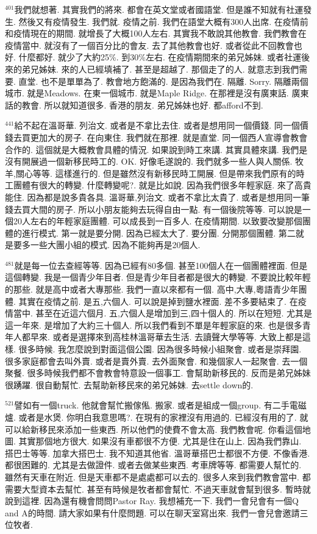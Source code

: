 \documentclass{book}
\begin{document}
$^{401}$我們就想著.
其實我們的將來.
都會在英文堂或者國語堂.
但是誰不知就有社運發生.
然後又有疫情發生.
我們就.
疫情之前.
我們在語堂大概有300人出席.
在疫情前和疫情現在的期間.
就增長了大概100人左右.
其實我不敢說其他教會.
我們教會在疫情當中.
就沒有了一個百分比的會友.
去了其他教會也好.
或者從此不回教會也好.
什麼都好.
就少了大約25\%.
到30\%左右.
在疫情期間來的弟兄姊妹.
或者社運後來的弟兄姊妹.
來的人已經填補了.
甚至是超越了.
那個走了的人.
就意志到我們需要.
直堂.
也不是單單為了.
教會地方飽滿的.
是因為我們在.
隔離.
Sorry.
隔離兩個城市.
就是Meadows.
在東一個城市.
就是Maple Ridge.
在那裡是沒有廣東話.
廣東話的教會.
所以就知道很多.
香港的朋友.
弟兄姊妹也好.
都afford不到.

$^{441}$給不起在溫哥華.
列治文.
或者是不拿比去住.
或者是想用同一個價錢.
同一個價錢去買更加大的房子.
在向東住.
我們就在那裡.
就是直堂.
同一個西人宣導會教會合作的.
這個就是大概教會具體的情況.
如果說到時工來講.
其實具體來講.
我們是沒有開展過一個新移民時工的.
OK.
好像毛遂說的.
我們就多一些人與人關係.
牧羊,關心等等.
這樣進行的.
但是雖然沒有新移民時工開展.
但是帶來我們原有的時工團體有很大的轉變.
什麼轉變呢?.
就是比如說.
因為我們很多年輕家庭.
來了高貴能住.
因為都是說多貴各具.
溫哥華,列治文.
或者不拿比太貴了.
或者是想用同一筆錢去買大間的房子.
所以小朋友能夠去玩得自由一點.
有一個後院等等.
可以說是一個20人左右的年輕家庭團體.
可以成長到一百多人.
在疫情期間.
以致要改變那個團體的進行模式.
第一就是要分開.
因為已經太大了.
要分團.
分開那個團體.
第二就是要多一些大團小組的模式.
因為不能夠再是20個人.

$^{481}$就是每一位去查經等等.
因為已經有80多個.
甚至100個人在一個團體裡面.
但是這個轉變.
我是一個青少年目者.
但是青少年目者都是很大的轉變.
不要說比較年輕的那些.
就是高中或者大專那些.
我們一直以來都有一個.
高中,大專,粵語青少年團體.
其實在疫情之前.
是五,六個人.
可以說是掉到鹽水裡面.
差不多要結束了.
在疫情當中.
甚至在近這六個月.
五,六個人是增加到三,四十個人的.
所以在短短.
尤其是這一年來.
是增加了大約三十個人.
所以我們看到不單是年輕家庭的來.
也是很多青年人都早來.
或者是選擇來到高桂林溫哥華去生活.
去讀聲大學等等.
大致上都是這樣.
很多時候.
我怎麼說到對面這個公園.
因為很多時候小組聚會.
或者是崇拜園.
很多家庭都會去叫外賣.
或者是賣外賣.
去外面聚會.
和幾個家人一起聚會.
去一個聚餐.
很多時候我們都不會教會特意設一個事工.
會幫助新移民的.
反而是弟兄姊妹很踴躍.
很自動幫忙.
去幫助新移民來的弟兄姊妹.
去settle down的.

$^{521}$譬如有一個truck.
他就會幫忙搬傢俬.
搬家.
或者是組成一個group.
有二手電磁爐.
或者是水煲.
你明白我意思嗎?.
在現有的家裡沒有用過的.
已經沒有用的了.
就可以給新移民來添加一些東西.
所以他們的使費不會太高.
我們教會呢.
你看這個地圖.
其實那個地方很大.
如果沒有車都很不方便.
尤其是住在山上.
因為我們靠山.
搭巴士等等.
加拿大搭巴士.
我不知道其他省.
溫哥華搭巴士都很不方便.
不像香港.
都很困難的.
尤其是去做證件.
或者去做某些東西.
考車牌等等.
都需要人幫忙的.
雖然有天車在附近.
但是天車都不是處處都可以去的.
很多人來到我們教會當中.
都需要大型資本去幫忙.
甚至有時候是牧者都會幫忙.
不過天車就會幫到很多.
暫時就說到這裡.
因為還有機會問問Pastor Ray.
我想補充一下.
我們一會兒會有一個Q and A的時間.
請大家如果有什麼問題.
可以在聊天室寫出來.
我們一會兒會邀請三位牧者.
\end{document}
